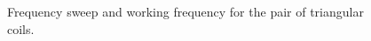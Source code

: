 \documentclass[a4paper,10pt]{article}
\begin{document}
\begin{figure}[tbp]
\begin{center}
 \caption{Frequency sweep and working frequency for the pair of triangular coils.}\label{fig:exp_3}
\end{center}
\end{figure}
\end{document}
